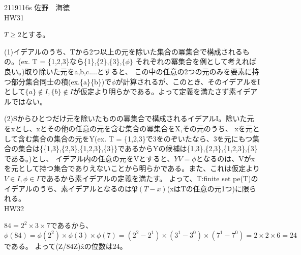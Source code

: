 \documentclass[11pt]{jsarticle}
\begin{document}
2119116s 佐野　海徳\\
HW31
\par $T \geq 2$とする。
\par (1)イデアルのうち、Tから2つ以上の元を除いた集合の冪集合で構成されるもの。(ex. T = \{1,2,3\}なら\{1\},\{2\},\{3\},$\{\phi\}$ それぞれの冪集合を例として考えれば良い。)取り除いた元をa,b,c....とすると、
この中の任意の2つの元のみを要素に持つ部分集合同士の積(ex.\{a\}\{b\})で$\phi$が計算されるが、このとき、そのイデアルをIとして$\{a\} \notin I,\{b\} \notin I$が仮定より明らかである。よって定義を満たさず素イデアルではない。
\par (2)Sからひとつだけ元を除いたものの冪集合で構成されるイデアルI。除いた元をxとし、xとその他の任意の元を含む集合の冪集合をX,その元のうち、
xを元として含む集合の集合の元をY(ex. T = \{1,2,3\}で3をのぞいたなら、3を元にもつ集合の集合は\{\{1,3\},\{2,3\},\{1,2,3\},\{3\}\}であるからYの候補は\{1,3\},\{2,3\},\{1,2,3\},\{3\}である。)とし、
イデアル内の任意の元をVとすると、$ YV  = \phi$となるのは、Vがxを元として持つ集合でありえないことから明らかである。また、これは仮定より$V \in I, \phi \in I$であるから素イデアルの定義を満たす。
よって、T:finite set pe(T)のイデアルのうち、素イデアルとなるのは$\mathfrak{P}(T - x)$(xはTの任意の元1つ)に限られる。
\\
HW32
\par
$84 = 2^2 \times 3 \times 7$であるから、$\phi(84) = \phi(2^2) \times \phi(3) \times \phi(7) = (2^2 - 2^1) \times (3^1 - 3^0) \times (7^1 - 7^0) = 2 \times 2 \times 6 = 24$である。
よって(Z/84Z)\^xの位数は24。
\end{document}
